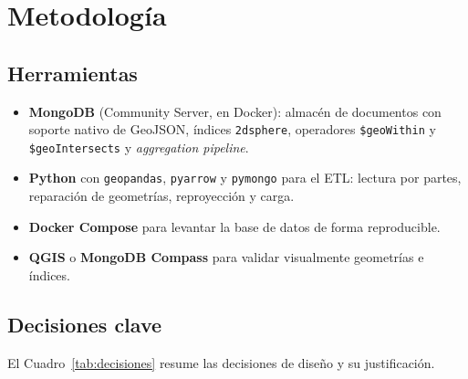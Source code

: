 \documentclass[11pt,letterpaper]{article}
\begin{document}
\section{Metodología}

\subsection{Herramientas}

\begin{itemize}
  \item \textbf{MongoDB} (Community Server, en Docker): almacén de documentos con soporte nativo de
  GeoJSON, índices \texttt{2dsphere}, operadores \texttt{\$geoWithin} y \texttt{\$geoIntersects} y
  \emph{aggregation pipeline}.
  \item \textbf{Python} con \texttt{geopandas}, \texttt{pyarrow} y \texttt{pymongo} para el ETL:
  lectura por partes, reparación de geometrías, reproyección y carga.
  \item \textbf{Docker Compose} para levantar la base de datos de forma reproducible.
  \item \textbf{QGIS} o \textbf{MongoDB Compass} para validar visualmente geometrías e índices.
\end{itemize}

\subsection{Decisiones clave}

El Cuadro~\ref{tab:decisiones} resume las decisiones de diseño y su justificación.
\end{document}
